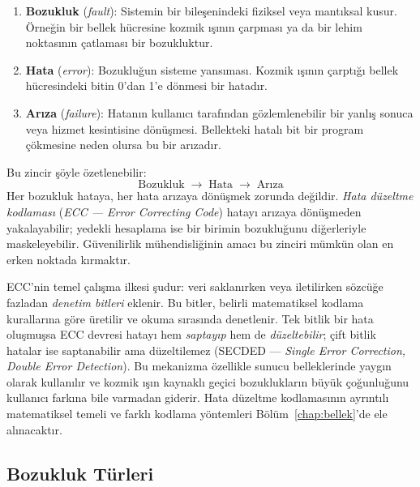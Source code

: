 \begin{enumerate}
    \item \textbf{Bozukluk} (\emph{fault}): Sistemin bir bileşenindeki fiziksel veya mantıksal kusur. Örneğin bir bellek hücresine kozmik ışının çarpması ya da bir lehim noktasının çatlaması bir bozukluktur.
    \item \textbf{Hata} (\emph{error}): Bozukluğun sisteme yansıması. Kozmik ışının çarptığı bellek hücresindeki bitin 0'dan 1'e dönmesi bir hatadır.
    \item \textbf{Arıza} (\emph{failure}): Hatanın kullanıcı tarafından gözlemlenebilir bir yanlış sonuca veya hizmet kesintisine dönüşmesi. Bellekteki hatalı bit bir program çökmesine neden olursa bu bir arızadır.
\end{enumerate}

Bu zincir şöyle özetlenebilir:
%
\[
\text{Bozukluk} \;\longrightarrow\; \text{Hata} \;\longrightarrow\; \text{Arıza}
\]
%
Her bozukluk hataya, her hata arızaya dönüşmek zorunda değildir. \emph{Hata düzeltme kodlaması} (\emph{ECC --- Error Correcting Code}) hatayı arızaya dönüşmeden yakalayabilir; yedekli hesaplama ise bir birimin bozukluğunu diğerleriyle maskeleyebilir. Güvenilirlik mühendisliğinin amacı bu zinciri mümkün olan en erken noktada kırmaktır.

ECC'nin temel çalışma ilkesi şudur: veri saklanırken veya iletilirken sözcüğe fazladan \emph{denetim bitleri} eklenir. Bu bitler, belirli matematiksel kodlama kurallarına göre üretilir ve okuma sırasında denetlenir. Tek bitlik bir hata oluşmuşsa ECC devresi hatayı hem \emph{saptayıp} hem de \emph{düzeltebilir}; çift bitlik hatalar ise saptanabilir ama düzeltilemez (SECDED --- \emph{Single Error Correction, Double Error Detection}). Bu mekanizma özellikle sunucu belleklerinde yaygın olarak kullanılır ve kozmik ışın kaynaklı geçici bozuklukların büyük çoğunluğunu kullanıcı farkına bile varmadan giderir. Hata düzeltme kodlamasının ayrıntılı matematiksel temeli ve farklı kodlama yöntemleri Bölüm~\ref{chap:bellek}'de ele alınacaktır.

\subsection{Bozukluk Türleri}
\label{subsec:bozukluk-turleri}

